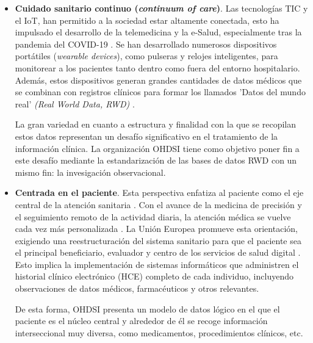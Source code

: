 \begin{itemize}

\item \textbf{Cuidado sanitario continuo (\textit{continuum of care})}. Las tecnologías TIC y el IoT, han permitido a la sociedad estar altamente conectada, esto ha impulsado el desarrollo de la telemedicina y la e-Salud, especialmente tras la pandemia del COVID-19 \cite{martin2021ehealth}. Se han desarrollado numerosos dispositivos portátiles (\textit{wearable devices}), como pulseras y relojes inteligentes, para monitorear a los pacientes tanto dentro como fuera del entorno hospitalario. Además, estos dispositivos generan grandes cantidades de datos médicos que se combinan con registros clínicos para formar los llamados 'Datos del mundo real' \textit{(Real World Data, RWD)} \cite{kouroubali2019new}. 

La gran variedad en cuanto a estructura y finalidad con la que se recopilan estos datos representan un desafío significativo en el tratamiento de la información clínica. La organización OHDSI tiene como objetivo poner fin a este desafío mediante la estandarización de las bases de datos RWD con un mismo fin: la invesigación observacional.


\item \textbf{Centrada en el paciente}. Esta perspectiva enfatiza al paciente como el eje central de la atención sanitaria \cite{tortorella2020healthcare}. Con el avance de la medicina de precisión y el seguimiento remoto de la actividad diaria, la atención médica se vuelve cada vez más personalizada \cite{ruiz2023inteligencia}. La Unión Europea promueve esta orientación, exigiendo una reestructuración del sistema sanitario para que el paciente sea el principal beneficiario, evaluador y centro de los servicios de salud digital \cite{ntafi2022legal, katehakis2019framework}. Esto implica la implementación de sistemas informáticos que administren el historial clínico electrónico (HCE) completo de cada individuo, incluyendo observaciones de datos médicos, farmacéuticos y otros relevantes.

De esta forma, OHDSI presenta un modelo de datos lógico en el que el paciente es el núcleo central y alrededor de él se recoge información interseccional muy diversa, como medicamentos, procedimientos clínicos, etc.


\end{itemize}
